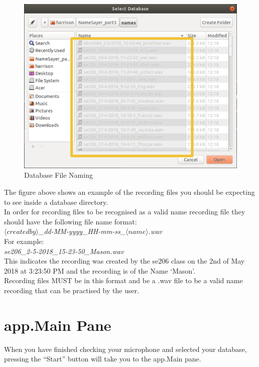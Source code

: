 \documentclass[a4paper,12pt]{article}
\begin{document}
\begin{figure}[!h]
	\includegraphics[width=\linewidth]{dbnames.png}
	\caption{Database File Naming}
\end{figure}

The figure above shows an example of the recording files you should be expecting to see inside a database directory. 
\\


In order for recording files to be recognised as a valid name recording file they should have the following file name format:
\\


\textit{$\langle created by\rangle$\_dd-MM-yyyy\_HH-mm-ss\_$\langle name\rangle$.wav}
\\


For example:
\\


\textit{se206\_2-5-2018\_15-23-50\_Mason.wav}
\\


This indicates the recording was created by the se206 class on the 2nd of May 2018 at 3:23:50 PM and the recording is of the Name ‘Mason’.
\\


Recording files MUST be in this format and be a .wav file to be a valid name recording that can be practised by the user.
\newpage
\section{app.Main Pane}
When you have finished checking your microphone and selected your database, pressing the “Start” button will take you to the app.Main pane.
\end{document}
